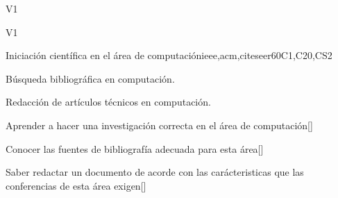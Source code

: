 \begin{syllabus}
\begin{outcomes}{V1}
  \item {}
  \item {}
  \item {}
  \item {}
  \item {}
  \item {}
  \item {}
  \item {}
\end{outcomes}
\begin{competences}{V1}
    \item {} 
    \item {}
    \item {}
\end{competences}

\begin{unit}{Iniciación científica en el área de computación}{}{ieee,acm,citeseer}{60}{C1,C20,CS2}
  \begin{topics}
      \item Búsqueda bibliográfica en computación.
      \item Redacción de artículos técnicos en computación.
  \end{topics}
  \begin{learningoutcomes}
      \item Aprender a hacer una investigación correcta en el área de computación[\Usage]
      \item Conocer las fuentes de bibliografía adecuada para esta área[\Usage]
      \item Saber redactar un documento de acorde con las carácteristicas que las conferencias de esta área exigen[\Usage]
  \end{learningoutcomes}
\end{unit}

\begin{coursebibliography}
\end{coursebibliography}

\end{syllabus}
